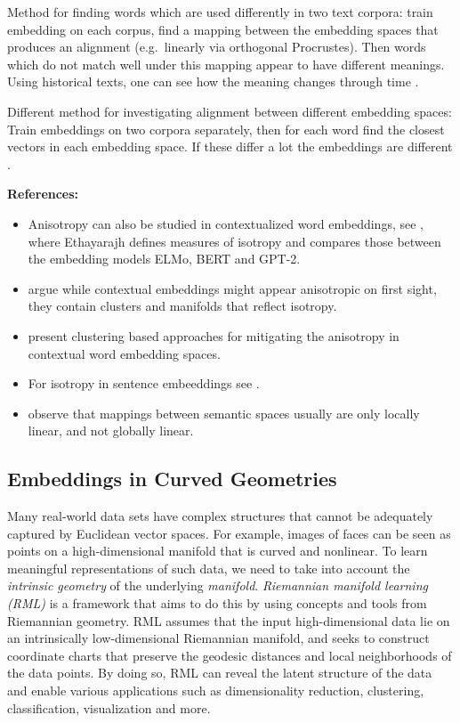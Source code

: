 \documentclass[11pt, a4paper]{amsart}
\begin{document}
Method for finding words which are used differently in two text corpora:
train embedding on each corpus, find a mapping between the embedding spaces that produces an alignment (e.g.\ linearly via orthogonal Procrustes).
Then words which do not match well under this mapping appear to have different meanings.
Using historical texts, one can see how the meaning changes through time \cite{hamilton-etal-2016-diachronic}.

Different method for investigating alignment between different embedding spaces:
Train embeddings on two corpora separately, then for each word find the closest vectors in each embedding space.
If these differ a lot the embeddings are different \cite{gonen-etal-2020-simple}.

\noindent \textbf{References:}
\begin{itemize}
	\item Anisotropy can also be studied in contextualized word embeddings, see \cite{ethayarajh-2019-contextual}, where Ethayarajh defines measures of isotropy and compares those between the embedding models ELMo, BERT and GPT-2.
	\item \cite{cai2021isotropy} argue while contextual embeddings might appear anisotropic on first sight, they contain clusters and manifolds that reflect isotropy.
	\item \cite{rajaee-pilehvar-2021-cluster} present clustering based approaches for mitigating the anisotropy in contextual word embedding spaces.
	\item For isotropy in sentence embeeddings see \cite{li-etal-2020-sentence}.
	\item \cite{nakashole-flauger-2018-characterizing} observe that mappings between semantic spaces usually are only locally linear, and not globally linear.
\end{itemize}


\subsection{Embeddings in Curved Geometries}

Many real-world data sets have complex structures that cannot be adequately captured by Euclidean vector spaces.
For example, images of faces can be seen as points on a high-dimensional manifold that is curved and nonlinear.
To learn meaningful representations of such data, we need to take into account the \emph{intrinsic geometry} of the underlying \emph{manifold}.
\emph{Riemannian manifold learning (RML)} is a framework that aims to do this by using concepts and tools from Riemannian geometry.
RML assumes that the input high-dimensional data lie on an intrinsically low-dimensional Riemannian manifold, and seeks to construct coordinate charts that preserve the geodesic distances and local neighborhoods of the data points. 
By doing so, RML can reveal the latent structure of the data and enable various applications such as dimensionality reduction, clustering, classification, visualization and more.
\end{document}
